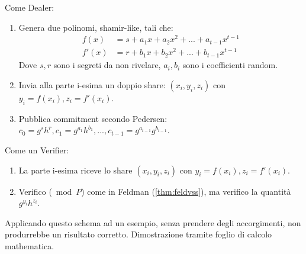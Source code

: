 \begin{definition}\label{def:pedvss}
Come Dealer:
\begin{enumerate}
    \item Genera due polinomi, shamir-like, tali che:
    \begin{equation*}
        \begin{aligned}
            f(x)&=s+a_1x+a_2x^2+...+a_{t-1}x^{t-1}\\
            f'(x)&=r+b_1x+b_2x^2+...+b_{t-1}x^{t-1}
        \end{aligned}
    \end{equation*}
    Dove $s,r$ sono i segreti da non rivelare, $a_i,b_i$ sono i coefficienti random.
    \item Invia alla parte i-esima un doppio share: $(x_i,y_i,z_i)$ con $y_i=f(x_i),z_i=f'(x_i)$.
    \item Pubblica commitment secondo Pedersen: $c_0=g^sh^r,c_1=g^{a_1}h^{b_1},...,c_{t-1}=g^{a_{t-1}}g^{b_{t-1}}$.
\end{enumerate}
Come un Verifier:
\begin{enumerate}
    \item La parte i-esima riceve lo share $(x_i,y_i,z_i)$ con $y_i=f(x_i),z_i=f'(x_i)$.
    \item Verifico ($\bmod P$) come in Feldman (\cref{thm:feldvss}), ma verifico la quantità $g^{y_i}h^{z_i}$.
\end{enumerate}
\end{definition}
\begin{remark}
Applicando questo schema ad un esempio, senza prendere degli accorgimenti, non produrrebbe un risultato corretto. Dimostrazione tramite foglio di calcolo mathematica.
\end{remark}
